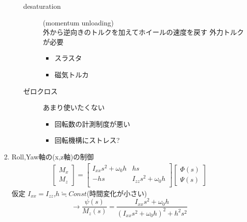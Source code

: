 \documentclass[class=article, crop=false, dvipdfmx]{standalone}
\begin{document}
\begin{enumerate}[label=(\theenumi)]
\begin{enumerate}

\begin{description}
\item [desaturation](momentum unloading)\\
外から逆向きのトルクを加えてホイールの速度を戻す
外力トルクが必要
\begin{itemize}
\item スラスタ
\item 磁気トルカ
\end{itemize}
\item [ゼロクロス]あまり使いたくない
\begin{itemize}
\item 回転数の計測制度が悪い
\item 回転機構にストレス?
\end{itemize}
\end{description}
\end{enumerate}
\item Roll,Yaw軸の(x,z軸)の制御\\
\begin{align}
 \begin{bmatrix}
   M_x\\
   M_z
 \end{bmatrix}
=
\begin{bmatrix}
  I_{xx} s^2 + \omega_0 h& hs\\
  -hs & I_{zz} s^2 + \omega_0 h\\
\end{bmatrix}
\begin{bmatrix}
  \Phi(s)\\
  \Psi(s)
\end{bmatrix}
\end{align}
仮定 $I_{xx} = I_{zz}$,$h \fallingdotseq Const$(時間変化が小さい)
\begin{equation}
\rightarrow \frac{\psi(s)}{M_z(s)} = 
\frac{I_{xx}s^2 + \omega_0 h}{(I_{xx}s^2 + \omega_0 h)^2 + h^2 s^2}
\end{equation}


\end{enumerate}
\end{document}
